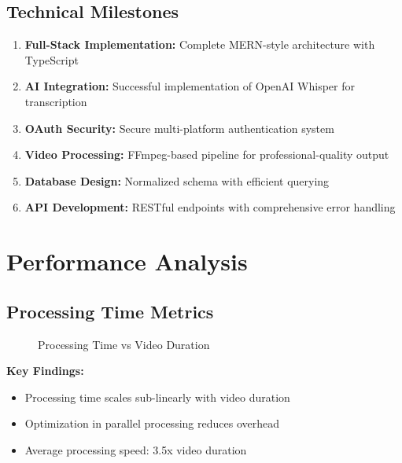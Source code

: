 \subsection{Technical Milestones}

\begin{enumerate}
    \item \textbf{Full-Stack Implementation:} Complete MERN-style architecture with TypeScript
    \item \textbf{AI Integration:} Successful implementation of OpenAI Whisper for transcription
    \item \textbf{OAuth Security:} Secure multi-platform authentication system
    \item \textbf{Video Processing:} FFmpeg-based pipeline for professional-quality output
    \item \textbf{Database Design:} Normalized schema with efficient querying
    \item \textbf{API Development:} RESTful endpoints with comprehensive error handling
\end{enumerate}

\section{Performance Analysis}

\subsection{Processing Time Metrics}

\begin{figure}[H]
\centering
{}
\caption{Processing Time vs Video Duration}
\end{figure}

\textbf{Key Findings:}
\begin{itemize}
    \item Processing time scales sub-linearly with video duration
    \item Optimization in parallel processing reduces overhead
    \item Average processing speed: 3.5x video duration
\end{itemize}

